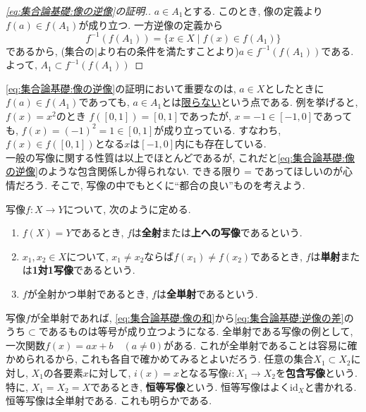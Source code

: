         \begin{proof}[\eqref{eq:集合論基礎:像の逆像}の証明.]
            $a\in A_1$とする. このとき, 像の定義より$f(a)\in f(A_1)$が成り立つ. 一方逆像の定義から
            \begin{equation*}
                f^{-1}(f(A_1))=\{x\in X\mid f(x)\in f(A_1)\}
            \end{equation*}
            であるから, (集合の$\mid$より右の条件を満たすことより)$a\in f^{-1}(f(A_1))$である. よって, $A_1\subset f^{-1}(f(A_1))$
        \end{proof}
        \eqref{eq:集合論基礎:像の逆像}の証明において重要なのは, $a\in X$としたときに$f(a)\in f(A_1)$であっても, $a\in A_1$とは\underline{限らない}という点である. 例を挙げると, $f(x)=x^2$のとき
        $f([0,1])=[0,1]$であったが, $x=-1\in [-1,0]$であっても, $f(x)=(-1)^2=1\in [0,1]$が成り立っている. すなわち, $f(x)\in f([0,1])$となる$x$は$[-1,0]$内にも存在している.\\

        一般の写像に関する性質は以上でほとんどであるが, これだと\eqref{eq:集合論基礎:像の逆像}のような包含関係しか得られない. できる限り$=$であってほしいのが心情だろう.
        そこで, 写像の中でもとくに``都合の良い''ものを考えよう.

        写像$f:X\rightarrow Y$について, 次のように定める.
        \begin{enumerate}
            \item $f(X)=Y$であるとき, $f$は\textbf{全射}または\textbf{上への写像}であるという.
            \item $x_1,x_2\in X$について, $x_1\neq x_2$ならば$f(x_1)\neq f(x_2)$であるとき, $f$は\textbf{単射}または\textbf{1対1写像}であるという.
            \item $f$が全射かつ単射であるとき, $f$は\textbf{全単射}であるという.
        \end{enumerate}
        写像$f$が全単射であれば, \eqref{eq:集合論基礎:像の和}から\eqref{eq:集合論基礎:逆像の差}のうち$\subset$であるものは等号が成り立つようになる. 
        全単射である写像の例として, 一次関数$f(x)=ax+b\quad (a\neq 0)$がある. これが全単射であることは容易に確かめられるから, これも各自で確かめてみるとよいだろう.
        \clearpage
        任意の集合$X_1\subset X_2$に対し, $X_1$の各要素$x$に対して, $i(x)=x$となる写像$i:X_1\rightarrow X_2$を\textbf{包含写像}という. 特に, $X_1=X_2=X$であるとき, 
        \textbf{恒等写像}という. 恒等写像はよく$\mathrm{id}_X$と書かれる. 恒等写像は全単射である. これも明らかである.\\


